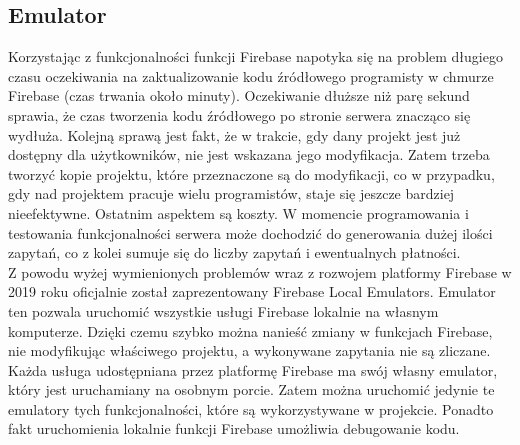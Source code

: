 \subsection{Emulator}

Korzystając z funkcjonalności funkcji Firebase napotyka się na problem długiego czasu oczekiwania na zaktualizowanie kodu źródłowego programisty w chmurze Firebase (czas trwania około minuty). Oczekiwanie dłuższe niż parę sekund sprawia, że czas tworzenia kodu źródłowego po stronie serwera znacząco się wydłuża. Kolejną sprawą jest fakt, że w trakcie, gdy dany projekt jest już dostępny dla użytkowników, nie jest wskazana jego modyfikacja. Zatem trzeba tworzyć kopie projektu, które przeznaczone są do modyfikacji, co w przypadku, gdy nad projektem pracuje wielu programistów, staje się jeszcze bardziej nieefektywne. Ostatnim aspektem są koszty. W momencie programowania i testowania funkcjonalności serwera może dochodzić do generowania dużej ilości zapytań, co z kolei sumuje się do liczby zapytań i ewentualnych płatności. \\

Z powodu wyżej wymienionych problemów wraz z rozwojem platformy Firebase w 2019 roku oficjalnie został zaprezentowany Firebase Local Emulators. Emulator ten pozwala uruchomić wszystkie usługi Firebase lokalnie na własnym komputerze. Dzięki czemu szybko można nanieść zmiany w funkcjach Firebase, nie modyfikując właściwego projektu, a wykonywane zapytania nie są zliczane. \\

Każda usługa udostępniana przez platformę Firebase ma swój własny emulator, który jest uruchamiany na osobnym porcie. Zatem można uruchomić jedynie te emulatory tych funkcjonalności, które są wykorzystywane w projekcie. Ponadto fakt uruchomienia lokalnie funkcji Firebase  umożliwia debugowanie kodu.



